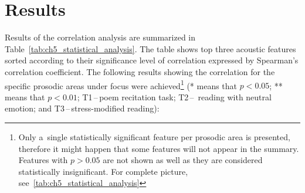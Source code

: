 \section{Results}
\label{ch5_4}

Results of the correlation analysis are summarized in Table~\ref{tab:ch5_statistical_analysis}. The table shows top three acoustic features sorted according to their significance level of correlation expressed by Spearman's correlation coefficient. The following results showing the correlation for the specific prosodic areas under focus were achieved\footnote{Only a~single statistically significant feature per prosodic area is presented, therefore it might happen that some features will not appear in the summary. Features with $p>0.05$ are not shown as well as they are considered statistically insignificant. For complete picture, see~\ref{tab:ch5_statistical_analysis}} (* means that $p<0.05$; ** means that $p<0.01$; T1\,--\,poem recitation task; T2\,--\, reading with neutral emotion; and T3\,--\,stress-modified reading):
